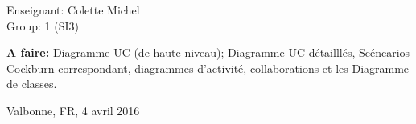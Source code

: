 \begin{titlepage}
\begin{center}
\vfill

\normalsize

Enseignant: Colette Michel\\
Group: 1 (SI3)

\vfill

\hfill
\parbox{0.5\linewidth}{\textbf{
A faire:} Diagramme UC (de haute niveau); Diagramme UC détailllés, Scéncarios Cockburn correspondant, diagrammes d'activité, collaborations et les Diagramme de classes.}


\vfill

\large

Valbonne, FR, 4 avril 2016

\end{center}

\end{titlepage}
